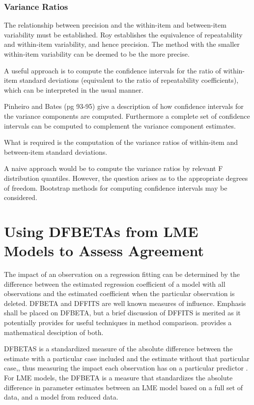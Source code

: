 \documentclass[12pt, a4paper]{report}
\theoremstyle{plain}
\theoremstyle{definition}
\theoremstyle{remark}
\begin{document}

\subsubsection{Variance Ratios}

The relationship between precision and the within-item and between-item variability must be established. Roy establishes the equivalence of repeatability and within-item variability, and hence precision.  The method with the smaller within-item variability can be deemed to be the more precise.

A useful approach is to compute the confidence intervals for the ratio of within-item standard deviations (equivalent to the ratio of repeatability coefficients), which can be interpreted in the usual manner.
%	

Pinheiro and Bates (pg 93-95) give a description of how confidence intervals for the variance components are computed. Furthermore a complete set of confidence intervals can be computed to complement the variance component estimates.

What is required is the computation of the variance ratios of within-item and between-item standard deviations.

A naive approach would be to compute the variance ratios by relevant F distribution quantiles. However, the question arises as to the appropriate degrees of freedom.
Bootstrap methods for computing confidence intervals may be considered.







\section{Using DFBETAs from LME Models to Assess Agreement}

	The impact of an observation on a regression fitting can be determined by the difference between the estimated regression coefficient of a model with all observations and the estimated coefficient when the particular observation is deleted. DFBETA and DFFITS are well known measures of influence. Emphasis shall be placed on DFBETA, but a brief discussion of DFFITS is merited as it potentially provides for useful techniques in method comparison. \citet{schabenberger} provides a mathematical desciption of both.
	
	 DFBETAS is a standardized measure of the absolute difference between the estimate with a particular
	case included and the estimate without that particular case,, thus measuring the impact each observation has on a particular predictor \citep{belsley2005}. For LME models, the DFBETA is a measure that standardizes the absolute difference in parameter estimates between an LME model based on a full set of data, and a model from reduced data.
\end{document}
